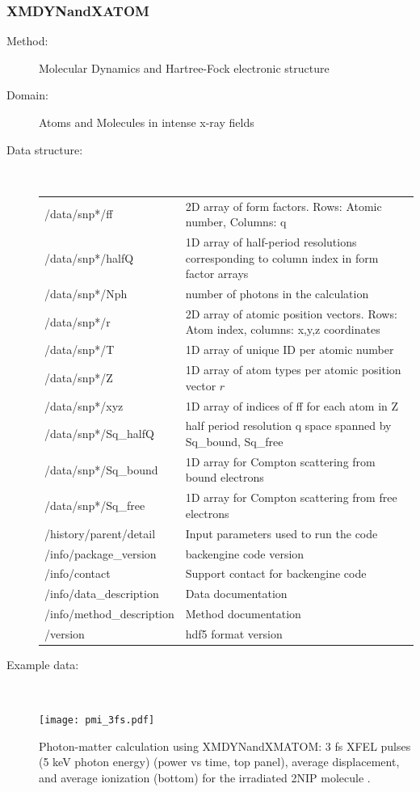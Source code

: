 \documentclass[12pt]{scrartcl}
\begin{document}
\subsubsection{XMDYNandXATOM\label{sec:interface_pmi_xmdyn}}
\begin{description}
  \item[Method:] Molecular Dynamics and Hartree-Fock electronic structure
  \item[Domain:] Atoms and Molecules in intense x-ray fields
  \item[Data structure:]\ \\
{\scriptsize%
\begin{tabular}{l|l}
  \hline
  \hline
  /data/snp*/ff        & 2D array of form factors. Rows: Atomic number, Columns: q  \\
  /data/snp*/halfQ        & 1D array of half-period resolutions corresponding to
  column index in form factor arrays \\
  /data/snp*/Nph        & number of photons in the calculation \\
  /data/snp*/r        & 2D array of atomic position vectors. Rows: Atom index,
  columns: x,y,z coordinates \\
  /data/snp*/T        & 1D array of unique ID per atomic number \\
  /data/snp*/Z        &  1D array of atom types per atomic position vector
  $r$\\
  /data/snp*/xyz        & 1D array of indices of ff for each atom in Z \\
  /data/snp*/Sq\_halfQ        & half period resolution q space spanned by
  Sq\_bound, Sq\_free \\
  /data/snp*/Sq\_bound        & 1D array for Compton scattering from bound electrons \\
  /data/snp*/Sq\_free        & 1D array for Compton scattering from free
  electrons \\
  /history/parent/detail        & Input parameters used to run the code \\
  /info/package\_version        & backengine code version \\
  /info/contact        & Support contact for backengine code \\
  /info/data\_description        & Data documentation \\
  /info/method\_description        & Method documentation \\
  /version                   & hdf5 format version \\
  \hline
  \hline
\end{tabular}
}
\item[Example data:]\ \\
      \begin{center}
        \texttt{[image: pmi\_3fs.pdf]}
      \end{center}
      \scriptsize{Photon-matter calculation using XMDYNandXMATOM:
        3 fs XFEL pulses (5 keV photon energy) (power vs time, top panel), average displacement, and average ionization
        (bottom) for the irradiated 2NIP molecule \cite{Schlessman1998, Fortmann-Grote2016b}.}
\end{description}
%
\end{document}
